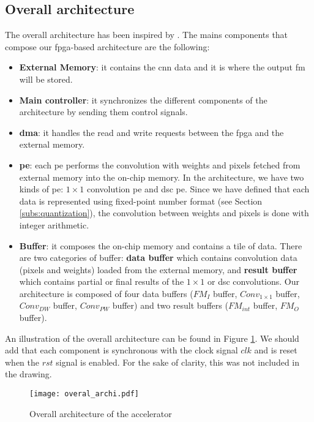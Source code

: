 \subsection{Overall architecture} \label{subsec:overal}
%
The overall architecture has been inspired by \textcite{zhu_efficient_2020}. The mains components that compose our \acrshort{fpga}-based architecture are the following:
%
\begin{itemize}
    \item \textbf{External Memory}: it contains the \acrshort{cnn} data and it is where the output \acrshort{fm} will be stored.
    \item \textbf{Main controller}: it synchronizes the different components of the architecture by sending them control signals.
    \item \textbf{\acrfull{dma}}: it handles the read and write requests between the \acrshort{fpga} and the external memory.
    \item \textbf{\acrshort{pe}}: each \acrshort{pe} performs the convolution with weights and pixels fetched from external memory into the on-chip memory. In the architecture, we have two kinds of \acrshort{pe}: $1 \times 1$ convolution \acrshort{pe} and \acrshort{dsc} \acrshort{pe}. Since we have defined that each data is represented using fixed-point number format (see Section \ref{subs:quantization}), the convolution between weights and pixels is done with integer arithmetic.
    \item \textbf{Buffer}: it composes the on-chip memory and contains a tile of data. There are two categories of buffer: \textbf{data buffer} which contains convolution data (pixels and weights) loaded from the external memory, and \textbf{result buffer} which contains partial or final results of the $1 \times 1$ or \acrshort{dsc} convolutions. Our architecture is composed of four data buffers ($FM_{I}$ buffer, $Conv_{1 \times 1}$ buffer, $Conv_{DW}$ buffer, $Conv_{PW}$ buffer) and two result buffers ($FM_{int}$ buffer, $FM_{O}$ buffer).
\end{itemize}
%
An illustration of the overall architecture can be found in Figure \ref{fig:overal_archi}. We should add that each component is synchronous with the clock signal $clk$ and is reset when the $rst$ signal is enabled. For the sake of clarity, this was not included in the drawing.
%
\begin{figure}[H]
    \centering
    \texttt{[image: overal\_archi.pdf]}
    \caption{Overall architecture of the accelerator}
    \label{fig:overal_archi}
\end{figure}
%

